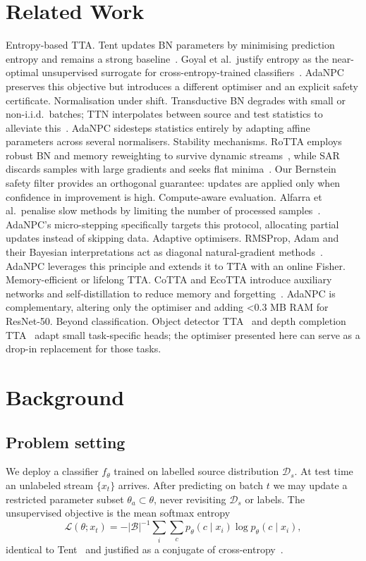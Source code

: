 \documentclass{article} %
\begin{document}
\section{Related Work}\label{sec:related}
Entropy-based TTA\@. Tent updates BN parameters by minimising prediction entropy and remains a strong baseline~\cite{wang-2020-tent}. Goyal et al.\ justify entropy as the near-optimal unsupervised surrogate for cross-entropy-trained classifiers~\cite{goyal-2022-test}. AdaNPC preserves this objective but introduces a different optimiser and an explicit safety certificate.
Normalisation under shift. Transductive BN degrades with small or non-i.i.d.\ batches; TTN interpolates between source and test statistics to alleviate this~\cite{lim-2023-ttn}. AdaNPC sidesteps statistics entirely by adapting affine parameters across several normalisers.
Stability mechanisms. RoTTA employs robust BN and memory reweighting to survive dynamic streams~\cite{yuan-2023-robust}, while SAR discards samples with large gradients and seeks flat minima~\cite{niu-2023-towards}. Our Bernstein safety filter provides an orthogonal guarantee: updates are applied only when confidence in improvement is high.
Compute-aware evaluation. Alfarra et al.\ penalise slow methods by limiting the number of processed samples~\cite{alfarra-2023-evaluation}. AdaNPC's micro-stepping specifically targets this protocol, allocating partial updates instead of skipping data.
Adaptive optimisers. RMSProp, Adam and their Bayesian interpretations act as diagonal natural-gradient methods~\cite{aitchison-2018-bayesian}. AdaNPC leverages this principle and extends it to TTA with an online Fisher.
Memory-efficient or lifelong TTA\@. CoTTA and EcoTTA introduce auxiliary networks and self-distillation to reduce memory and forgetting~\cite{song-2023-ecotta}. AdaNPC is complementary, altering only the optimiser and adding <0.3 MB RAM for ResNet-50.
Beyond classification. Object detector TTA~\cite{yoo-2023-what} and depth completion TTA~\cite{park-2024-test} adapt small task-specific heads; the optimiser presented here can serve as a drop-in replacement for those tasks.

\section{Background}\label{sec:background}
\subsection{Problem setting}
We deploy a classifier \(f_{\theta}\) trained on labelled source distribution \(\mathcal{D}_s\). At test time an unlabeled stream \(\{x_t\}\) arrives. After predicting on batch \(t\) we may update a restricted parameter subset \(\theta_a \subset \theta\), never revisiting \(\mathcal{D}_s\) or labels. The unsupervised objective is the mean softmax entropy
\[
\mathcal{L}(\theta; x_t) = -|\mathcal{B}|^{-1} \sum_i \sum_c p_{\theta}(c\mid x_i) \log p_{\theta}(c\mid x_i),
\]
identical to Tent~\cite{wang-2020-tent} and justified as a conjugate of cross-entropy~\cite{goyal-2022-test}.
\end{document}
